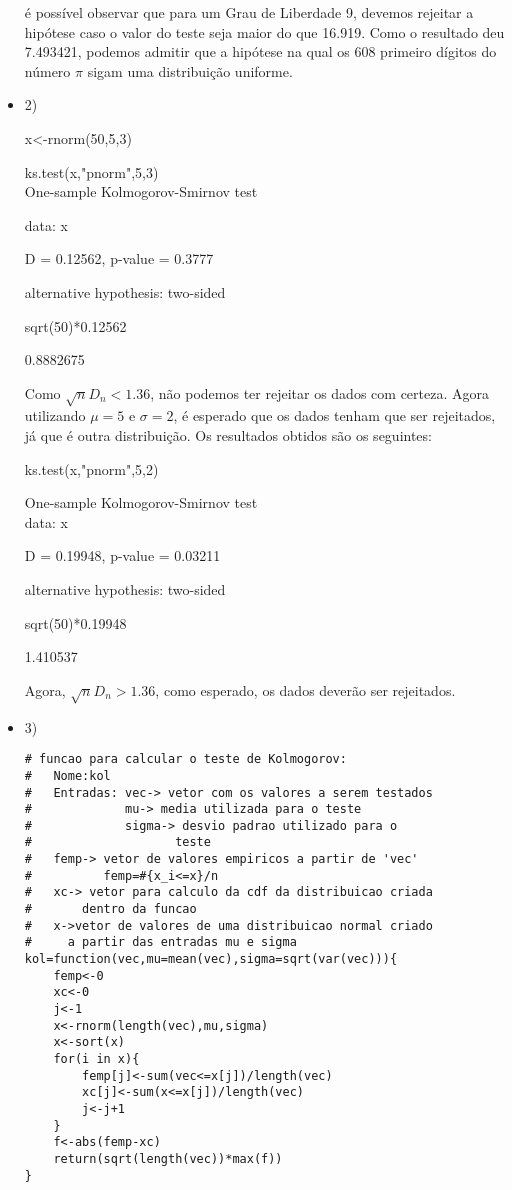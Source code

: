 \documentclass[11pt,a4paper]{book}
\begin{document}
\begin{itemize}
		é possível observar que para um Grau de Liberdade 9, devemos rejeitar a hipótese caso o valor do teste seja maior do que 16.919.
		Como o resultado deu 7.493421, podemos admitir que a hipótese na qual os 608 primeiro dígitos do número $\pi$ sigam uma distribuição uniforme.
		
		\item 2)
		
		x<-rnorm(50,5,3)

		ks.test(x,"pnorm",5,3)
\\
		One-sample Kolmogorov-Smirnov test

		data:  x

		D = 0.12562, p-value = 0.3777

		alternative hypothesis: two-sided
		
		sqrt(50)*0.12562
		
		0.8882675
		
		Como $\sqrt{n}D_n<1.36$, não podemos ter rejeitar os dados com certeza.
		Agora utilizando $\mu =5$ e $\sigma=2$, é esperado que os dados tenham que ser rejeitados, já que é outra distribuição.
		Os resultados obtidos são os seguintes:
		
		ks.test(x,"pnorm",5,2)

		One-sample Kolmogorov-Smirnov test
\\
		data:  x

		D = 0.19948, p-value = 0.03211
		
		alternative hypothesis: two-sided

		sqrt(50)*0.19948
		
		1.410537
		
		Agora, $\sqrt{n}D_n>1.36$, como esperado, os dados deverão ser rejeitados.
		
		\item 3)
		
		\begin{lstlisting}
# funcao para calcular o teste de Kolmogorov:
# 	Nome:kol
#	Entradas: vec-> vetor com os valores a serem testados
#			  mu-> media utilizada para o teste
#			  sigma-> desvio padrao utilizado para o
#					 teste
#	femp-> vetor de valores empiricos a partir de 'vec'
#		   femp=#{x_i<=x}/n
#	xc-> vetor para calculo da cdf da distribuicao criada
#		dentro da funcao
#	x->vetor de valores de uma distribuicao normal criado 
#	  a partir das entradas mu e sigma
kol=function(vec,mu=mean(vec),sigma=sqrt(var(vec))){
	femp<-0 
   	xc<-0
	j<-1
	x<-rnorm(length(vec),mu,sigma)
	x<-sort(x)
	for(i in x){
		femp[j]<-sum(vec<=x[j])/length(vec)
		xc[j]<-sum(x<=x[j])/length(vec)
		j<-j+1
	}
	f<-abs(femp-xc)
	return(sqrt(length(vec))*max(f))
}
		\end{lstlisting}
		

\end{itemize}
\end{document}
